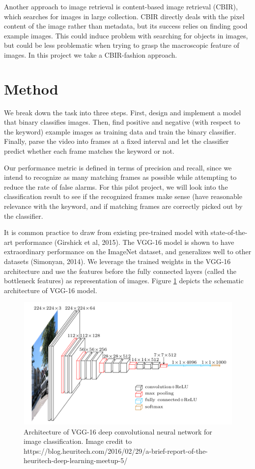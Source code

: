 \documentclass{article}
\begin{document}
Another approach to image retrieval is content-based image retrieval (CBIR), which searches for images in large collection. CBIR directly deals with the pixel content of the image rather than metadata, but its success relies on finding good example images. This could induce problem with searching for objects in images, but could be less problematic when trying to grasp the macroscopic feature of images. In this project we take a CBIR-fashion approach. 

\section{Method}

We break down the task into three steps. First, design and implement a model that binary classifies images. Then, find positive and negative (with respect to the keyword) example images as training data and train the binary classifier. Finally, parse the video into frames at a fixed interval and let the classifier predict whether each frame matches the keyword or not. 

Our performance metric is defined in terms of precision and recall, since we intend to recognize as many matching frames as possible while attempting to reduce the rate of false alarms. For this pilot project, we will look into the classification result to see if the recognized frames make sense (have reasonable relevance with the keyword, and if matching frames are correctly picked out by the classifier. 

It is common practice to draw from existing pre-trained model with state-of-the-art performance (Girshick et al, 2015). The VGG-16 model is shown to have extraordinary performance on the ImageNet dataset, and generalizes well to other datasets (Simonyan, 2014). We leverage the trained weights in the VGG-16 architecture and use the features before the fully connected layers (called the bottleneck features) as representation of images. Figure \ref{fig:vgg-16} depicts the schematic architecture of VGG-16 model. 

\begin{figure}[h]
	\label{fig:vgg-16}
	\centering
	\includegraphics[scale=0.4]{image/vgg16.png}
	\caption{Architecture of VGG-16 deep convolutional neural network for image classification. Image credit to https://blog.heuritech.com/2016/02/29/a-brief-report-of-the-heuritech-deep-learning-meetup-5/}
\end{figure}
\end{document}
